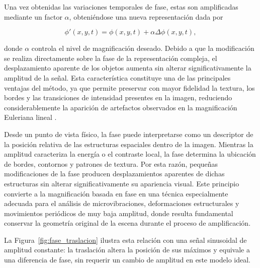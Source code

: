 Una vez obtenidas las variaciones temporales de fase, estas son amplificadas mediante un factor $\alpha$, obteniéndose una nueva representación dada por

\begin{equation}
\phi'(x,y,t)
=
\phi(x,y,t)
+
\alpha
\Delta\phi(x,y,t),
\label{eq:phase_amp}
\end{equation}

donde $\alpha$ controla el nivel de magnificación deseado. Debido a que la modificación se realiza directamente sobre la fase de la representación compleja, el desplazamiento aparente de los objetos aumenta sin alterar significativamente la amplitud de la señal. Esta característica constituye una de las principales ventajas del método, ya que permite preservar con mayor fidelidad la textura, los bordes y las transiciones de intensidad presentes en la imagen, reduciendo considerablemente la aparición de artefactos observados en la magnificación Euleriana lineal \cite{wadhwa2013phase,ahmed2023overview}.

Desde un punto de vista físico, la fase puede interpretarse como un descriptor de la posición relativa de las estructuras espaciales dentro de la imagen. Mientras la amplitud caracteriza la energía o el contraste local, la fase determina la ubicación de bordes, contornos y patrones de textura. Por esta razón, pequeñas modificaciones de la fase producen desplazamientos aparentes de dichas estructuras sin alterar significativamente su apariencia visual. Este principio convierte a la magnificación basada en fase en una técnica especialmente adecuada para el análisis de microvibraciones, deformaciones estructurales y movimientos periódicos de muy baja amplitud, donde resulta fundamental conservar la geometría original de la escena durante el proceso de amplificación.

La Figura~\ref{fig:fase_traslacion} ilustra esta relación con una señal sinusoidal de amplitud constante: la traslación altera la posición de sus máximos y equivale a una diferencia de fase, sin requerir un cambio de amplitud en este modelo ideal.

